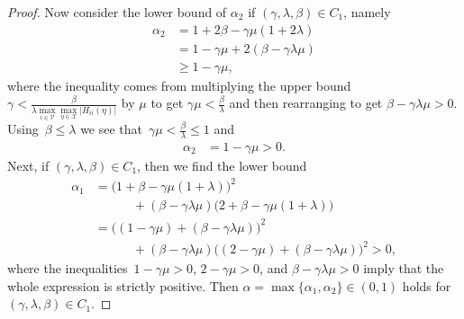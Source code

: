 \documentclass[10pt,a4paper]{amsart}
\newcommand{\V}{\ensuremath{\mathcal{V}}\xspace}
\newcommand{\X}{\ensuremath{\mathcal{X}}\xspace}
\begin{document}
\begin{proof}
    Now consider the lower bound of $\alpha_2$ if $(\gamma,\lambda,\beta)\in C_1$, namely
    \begin{align}
        \alpha_2 &= 1 + 2\beta-\gamma\mu(1+2\lambda)
        \\&= 1 -\gamma\mu + 2(\beta-\gamma\lambda\mu)
        \\ &\geq 1-\gamma\mu,
    \end{align}
    where the inequality comes from multiplying the upper bound $\gamma< \frac{\beta}{\lambda\max\limits_{i\in\V}\max\limits_{\eta\in\X}\vert H_{ii}(\eta)\vert}$ by $\mu$ 
    to get $\gamma\mu< \frac{\beta}{\lambda}$ and then rearranging to get $\beta-\gamma\lambda\mu>0$.
    Using~$\beta \leq \lambda$ we see that~$\gamma\mu < \frac{\beta}{\lambda} \leq 1$ and 
    \begin{align}
        \alpha_2 &= 1-\gamma\mu>0.
    \end{align}
    Next, if $(\gamma,\lambda,\beta)\in C_1$, then we find the lower bound
    \begin{align}
        \alpha_1 &=\big(1 + \beta -\gamma\mu(1+\lambda)\big)^2 
        \\ &\quad\quad\quad + (\beta - \gamma\lambda\mu)\big(2+\beta-\gamma\mu(1+\lambda)\big)
        \\ &=\big((1-\gamma\mu) + (\beta-\gamma\lambda\mu)\big)^2
        \\ &\quad\quad\quad + (\beta-\gamma\lambda\mu)\big((2 -\gamma\mu) + (\beta-\gamma\lambda\mu)\big)^2
        >0,
    \end{align}
    where the inequalities~$1 - \gamma\mu > 0$, $2 - \gamma\mu > 0$, and
    $\beta - \gamma\lambda\mu > 0$ imply that the whole expression is strictly positive. 
    Then $\alpha=\max\{\alpha_1,\alpha_2\}\in (0,1)$ holds for $(\gamma,\lambda,\beta)\in C_1$.
      

\end{proof}
\end{document}
